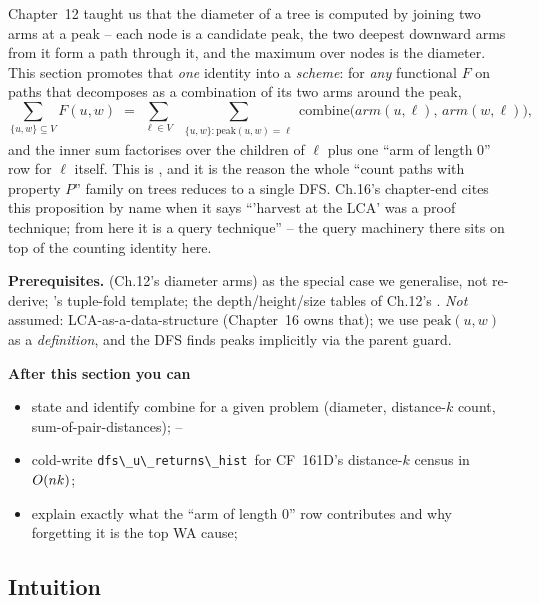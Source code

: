 \begin{topicintro}
Chapter~12 taught us that the diameter of a tree is computed by joining
two arms at a peak -- each node is a candidate peak, the two deepest
downward arms from it form a path through it, and the maximum over nodes
is the diameter. This section promotes that \emph{one} identity into a
\emph{scheme}: for \emph{any} functional $F$ on paths that decomposes as a
combination of its two arms around the peak,
\[
  \sum_{\{u,w\}\subseteq V} F(u,w)
  \;=\;
  \sum_{\ell\in V}\;\sum_{\substack{\{u,w\}: \mathrm{peak}(u,w)=\ell}} \mathrm{combine}\!\big(\mathit{arm}(u,\ell),\,\mathit{arm}(w,\ell)\big),
\]
and the inner sum factorises over the children of $\ell$ plus one
``arm of length $0$'' row for $\ell$ itself. This is ,
and it is the reason the whole ``count paths with property $P$'' family
on trees reduces to a single DFS. Ch.16's chapter-end cites this
proposition by name when it says ``'harvest at the LCA' was a proof
technique; from here it is a query technique'' -- the query machinery
there sits on top of the counting identity here.

\textbf{Prerequisites.}  (Ch.12's diameter arms) as the
special case we generalise, not re-derive; 's
tuple-fold template; the depth/height/size tables of Ch.12's
. \emph{Not} assumed: LCA-as-a-data-structure
(Chapter~16 owns that); we use $\mathrm{peak}(u,w)$ as a \emph{definition},
and the DFS finds peaks implicitly via the parent guard.

\textbf{After this section you can}
\begin{itemize}[nosep]
  \item state  and identify $\mathrm{combine}$ for a
        given problem (diameter, distance-$k$ count, sum-of-pair-distances);
        \hfill{}--
  \item cold-write \lstinline{dfs\_u\_returns\_hist}\ for CF~161D's
        distance-$k$ census in $O(nk)$; \hfill{}
  \item explain exactly what the ``arm of length $0$'' row contributes
        and why forgetting it is the top WA cause; \hfill{}
\end{itemize}
\end{topicintro}

\subsection{Intuition}

